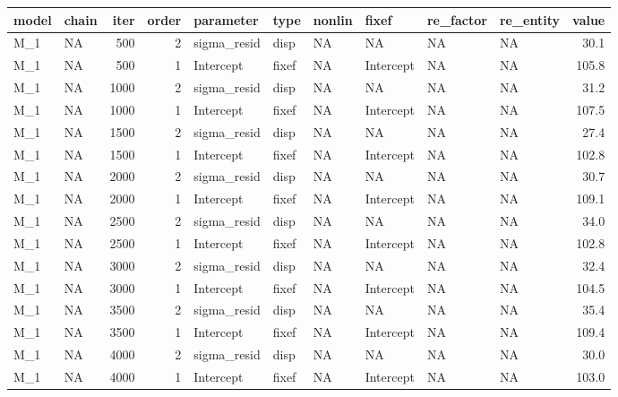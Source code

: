 \documentclass[]{svmono}
\newenvironment{Shaded}{\begin{snugshade}}{\end{snugshade}}
\newcommand{\KeywordTok}[1]{\textcolor[rgb]{0.13,0.29,0.53}{\textbf{#1}}}
\newcommand{\DecValTok}[1]{\textcolor[rgb]{0.00,0.00,0.81}{#1}}
\newcommand{\StringTok}[1]{\textcolor[rgb]{0.31,0.60,0.02}{#1}}
\newcommand{\OperatorTok}[1]{\textcolor[rgb]{0.81,0.36,0.00}{\textbf{#1}}}
\newcommand{\NormalTok}[1]{#1}
\begin{document}
\begin{Shaded}
\end{Shaded}

\begin{tabular}{l|l|r|r|l|l|l|l|l|l|r}
\hline
model & chain & iter & order & parameter & type & nonlin & fixef & re\_factor & re\_entity & value\\
\hline
M\_1 & NA & 500 & 2 & sigma\_resid & disp & NA & NA & NA & NA & 30.1\\
\hline
M\_1 & NA & 500 & 1 & Intercept & fixef & NA & Intercept & NA & NA & 105.8\\
\hline
M\_1 & NA & 1000 & 2 & sigma\_resid & disp & NA & NA & NA & NA & 31.2\\
\hline
M\_1 & NA & 1000 & 1 & Intercept & fixef & NA & Intercept & NA & NA & 107.5\\
\hline
M\_1 & NA & 1500 & 2 & sigma\_resid & disp & NA & NA & NA & NA & 27.4\\
\hline
M\_1 & NA & 1500 & 1 & Intercept & fixef & NA & Intercept & NA & NA & 102.8\\
\hline
M\_1 & NA & 2000 & 2 & sigma\_resid & disp & NA & NA & NA & NA & 30.7\\
\hline
M\_1 & NA & 2000 & 1 & Intercept & fixef & NA & Intercept & NA & NA & 109.1\\
\hline
M\_1 & NA & 2500 & 2 & sigma\_resid & disp & NA & NA & NA & NA & 34.0\\
\hline
M\_1 & NA & 2500 & 1 & Intercept & fixef & NA & Intercept & NA & NA & 102.8\\
\hline
M\_1 & NA & 3000 & 2 & sigma\_resid & disp & NA & NA & NA & NA & 32.4\\
\hline
M\_1 & NA & 3000 & 1 & Intercept & fixef & NA & Intercept & NA & NA & 104.5\\
\hline
M\_1 & NA & 3500 & 2 & sigma\_resid & disp & NA & NA & NA & NA & 35.4\\
\hline
M\_1 & NA & 3500 & 1 & Intercept & fixef & NA & Intercept & NA & NA & 109.4\\
\hline
M\_1 & NA & 4000 & 2 & sigma\_resid & disp & NA & NA & NA & NA & 30.0\\
\hline
M\_1 & NA & 4000 & 1 & Intercept & fixef & NA & Intercept & NA & NA & 103.0\\
\hline
\end{tabular}
\end{document}
